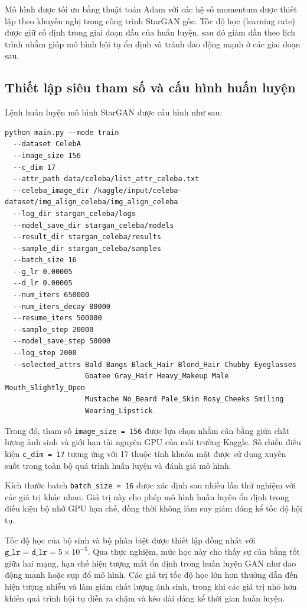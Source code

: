 \documentclass[../DoAn.tex]{subfiles}
\begin{document}
Mô hình được tối ưu bằng thuật toán Adam với các hệ số momentum được thiết lập theo khuyến nghị trong công trình StarGAN gốc. Tốc độ học (learning rate) được giữ cố định trong giai đoạn đầu của huấn luyện, sau đó giảm dần theo lịch trình nhằm giúp mô hình hội tụ ổn định và tránh dao động mạnh ở các giai đoạn sau.

\subsection{Thiết lập siêu tham số và cấu hình huấn luyện}
Lệnh huấn luyện mô hình StarGAN được cấu hình như sau:
\begin{verbatim}
python main.py --mode train 
  --dataset CelebA 
  --image_size 156 
  --c_dim 17 
  --attr_path data/celeba/list_attr_celeba.txt 
  --celeba_image_dir /kaggle/input/celeba-dataset/img_align_celeba/img_align_celeba 
  --log_dir stargan_celeba/logs 
  --model_save_dir stargan_celeba/models 
  --result_dir stargan_celeba/results 
  --sample_dir stargan_celeba/samples 
  --batch_size 16 
  --g_lr 0.00005 
  --d_lr 0.00005 
  --num_iters 650000 
  --num_iters_decay 80000 
  --resume_iters 500000 
  --sample_step 20000 
  --model_save_step 50000 
  --log_step 2000 
  --selected_attrs Bald Bangs Black_Hair Blond_Hair Chubby Eyeglasses 
                   Goatee Gray_Hair Heavy_Makeup Male Mouth_Slightly_Open 
                   Mustache No_Beard Pale_Skin Rosy_Cheeks Smiling 
                   Wearing_Lipstick
\end{verbatim}

Trong đó, tham số \texttt{image\_size = 156} được lựa chọn nhằm cân bằng giữa chất lượng ảnh sinh và giới hạn tài nguyên GPU của môi trường Kaggle. Số chiều điều kiện \texttt{c\_dim = 17} tương ứng với 17 thuộc tính khuôn mặt được sử dụng xuyên suốt trong toàn bộ quá trình huấn luyện và đánh giá mô hình.

Kích thước batch \texttt{batch\_size = 16} được xác định sau nhiều lần thử nghiệm với các giá trị khác nhau. Giá trị này cho phép mô hình huấn luyện ổn định trong điều kiện bộ nhớ GPU hạn chế, đồng thời không làm suy giảm đáng kể tốc độ hội tụ.

Tốc độ học của bộ sinh và bộ phân biệt được thiết lập đồng nhất với 
$\texttt{g\_lr} = \texttt{d\_lr} = 5 \times 10^{-5}$. 
Qua thực nghiệm, mức học này cho thấy sự cân bằng tốt giữa hai mạng, hạn chế hiện tượng mất ổn định trong huấn luyện GAN như dao động mạnh hoặc sụp đổ mô hình. 
Các giá trị tốc độ học lớn hơn thường dẫn đến hiện tượng nhiễu và làm giảm chất lượng ảnh sinh, trong khi các giá trị nhỏ hơn khiến quá trình hội tụ diễn ra chậm và kéo dài đáng kể thời gian huấn luyện.
\end{document}
